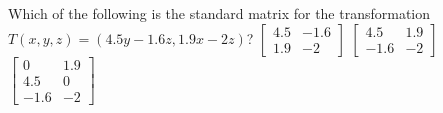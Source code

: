 \begin{activity}
Which of the following is the standard matrix for the transformation \(T(x,y,z)=(4.5y-1.6z,1.9x-2z)\)?
{\(\begin{bmatrix} 4.5&-1.6\\1.9&-2 \end{bmatrix}\)}
{\(\begin{bmatrix} 4.5&1.9\\-1.6&-2 \end{bmatrix}\)}
{\(\begin{bmatrix} 0&1.9\\4.5&0\\-1.6&-2 \end{bmatrix}\)}
\end{activity}




